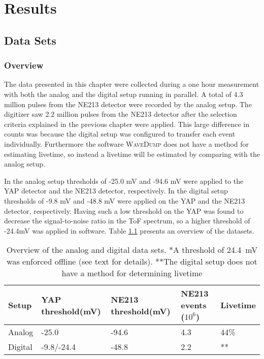 \documentclass[main.tex]{subfiles}
\begin{document}
\chapter{Results}\label{ch:results}

\section{Data Sets}
\subsection{Overview}
The data presented in this chapter were collected during a one hour measurement with both the analog and the digital setup running in parallel. A total of 4.3 million pulses from the NE213 detector were recorded by the analog setup. The digitizer saw 2.2 million pulses from the NE213 detector after the selection criteria explained in the previous chapter were applied. This large difference in counts was because the digital setup was configured to transfer each event individually. Furthermore the software \textsc{WaveDump} does not have a method for estimating livetime, so instead a livetime will be estimated by comparing with the analog setup.

In the analog setup thresholds of -25.0 mV and -94.6 mV were applied to the YAP detector and the NE213 detector, respectively. In the digital setup thresholds of -9.8 mV and -48.8 mV were applied on the YAP and the NE213 detector, respectively. Having such a low threshold on the YAP was found to decrease the signal-to-noise ratio in the ToF spectrum, so a higher threshold of -24.4\si{\milli\volt} was applied in software. Table \ref{tab:settings} presents an overview of the datasets.
\begin{table}[bh]
\begin{tabular}{|l|l|l|l|l|}
\hline
Setup   & YAP threshold(mV) & NE213 threshold(mV) & NE213 events ($\text{10}^\text{6}$) & Livetime \\ \hline
Analog  & -25.0              & -94.6                & 4.3      & 44\%             \\ \hline
Digital & -9.8/-24.4			& -48.8                & 2.2      & **             \\ \hline
\end{tabular}
\caption[Overview of the analog and digital data sets.]{Overview of the analog and digital data sets. *A threshold of \SI{24.4}{mV} was enforced offline (see text for details). **The digital setup does not have a method for determining livetime}
\label{tab:settings}
\end{table}
\end{document}

